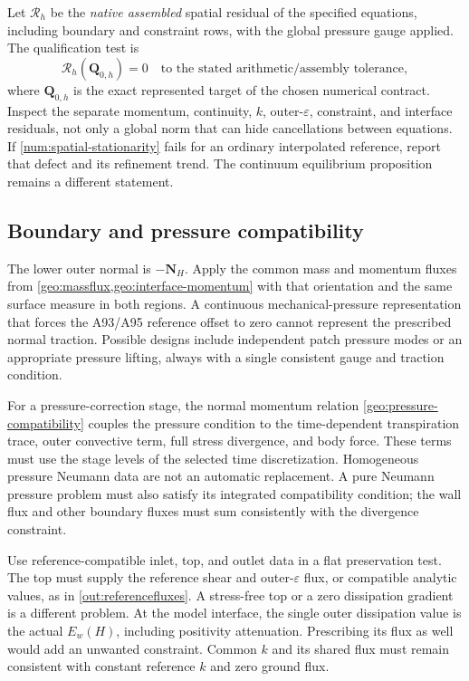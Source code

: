 \documentclass[11pt,a4paper]{article}
\numberwithin{equation}{section}
\newcommand{\eps}{\varepsilon}
\begin{document}
Let $\mathcal R_h$ be the \emph{native assembled} spatial residual
of the specified equations, including boundary and constraint rows,
with the global pressure gauge applied.  The qualification test is
\begin{equation}
 \mathcal R_h(\boldsymbol Q_{0,h})=0
 \quad\text{to the stated arithmetic/assembly tolerance},
 \label{num:spatial-stationarity}
\end{equation}
where $\boldsymbol Q_{0,h}$ is the exact represented target of the
chosen numerical contract.  Inspect the separate momentum,
continuity, $k$, outer-$\eps$, constraint, and interface residuals,
not only a global norm that can hide cancellations between equations.
If \cref{num:spatial-stationarity} fails for an ordinary interpolated
reference, report that defect and its refinement trend.  The
continuum equilibrium proposition remains a different statement.

\subsection{Boundary and pressure compatibility}
\label{num:pressure-compatibility}

The lower outer normal is $-\boldsymbol N_H$.  Apply the common
mass and momentum fluxes from \cref{geo:massflux,geo:interface-momentum}
with that orientation and the same surface measure in both regions.
A continuous mechanical-pressure representation that forces the
A93/A95 reference offset to zero cannot represent the prescribed
normal traction.  Possible designs include independent patch
pressure modes or an appropriate pressure lifting, always with a
single consistent gauge and traction condition.

For a pressure-correction stage, the normal momentum relation
\cref{geo:pressure-compatibility} couples the pressure condition to
the time-dependent transpiration trace, outer convective term,
full stress divergence, and body force.  These terms must use the
stage levels of the selected time discretization.  Homogeneous
pressure Neumann data are not an automatic replacement.  A pure
Neumann pressure problem must also satisfy its integrated
compatibility condition; the wall flux and other boundary fluxes
must sum consistently with the divergence constraint.

Use reference-compatible inlet, top, and outlet data in a flat
preservation test.  The top must supply the reference shear and
outer-$\eps$ flux, or compatible analytic values, as in
\cref{out:referencefluxes}.  A stress-free top or a zero dissipation
gradient is a different problem.  At the model interface, the
single outer dissipation value is the actual $E_w(H)$, including
positivity attenuation.  Prescribing its flux as well would add
an unwanted constraint.  Common $k$ and its shared flux must remain
consistent with constant reference $k$ and zero ground flux.
\end{document}

